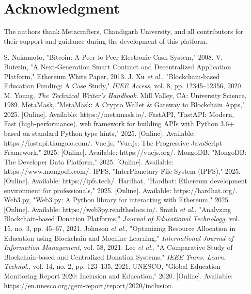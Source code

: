 \documentclass[a4paper,12pt]{report}
\begin{document}
\section*{Acknowledgment}
The authors thank Metacrafters, Chandigarh University, and all contributors for their support and guidance during the development of this platform.

\begin{thebibliography}{00}
 S. Nakamoto, "Bitcoin: A Peer-to-Peer Electronic Cash System," 2008.
 V. Buterin, "A Next-Generation Smart Contract and Decentralized Application Platform," Ethereum White Paper, 2013.
 J. Xu \textit{et al.}, "Blockchain-based Education Funding: A Case Study," \textit{IEEE Access}, vol. 8, pp. 12345--12356, 2020.
 M. Young, \textit{The Technical Writer's Handbook}. Mill Valley, CA: University Science, 1989.
 MetaMask, "MetaMask: A Crypto Wallet \& Gateway to Blockchain Apps," 2025. [Online]. Available: https://metamask.io/.
 FastAPI, "FastAPI: Modern, Fast (high-performance), web framework for building APIs with Python 3.6+ based on standard Python type hints," 2025. [Online]. Available: https://fastapi.tiangolo.com/.
 Vue.js, "Vue.js: The Progressive JavaScript Framework," 2025. [Online]. Available: https://vuejs.org/.
 MongoDB, "MongoDB: The Developer Data Platform," 2025. [Online]. Available: https://www.mongodb.com/.
 IPFS, "InterPlanetary File System (IPFS)," 2025. [Online]. Available: https://ipfs.tech/.
 Hardhat, "Hardhat: Ethereum development environment for professionals," 2025. [Online]. Available: https://hardhat.org/.
 Web3.py, "Web3.py: A Python library for interacting with Ethereum," 2025. [Online]. Available: https://web3py.readthedocs.io/.
 Smith \textit{et al.}, "Analyzing Blockchain-based Donation Platforms," \textit{Journal of Educational Technology}, vol. 15, no. 3, pp. 45--67, 2021.
 Johnson \textit{et al.}, "Optimizing Resource Allocation in Education using Blockchain and Machine Learning," \textit{International Journal of Information Management}, vol. 58, 2021.
 Lee \textit{et al.}, "A Comparative Study of Blockchain-based and Centralized Donation Systems," \textit{IEEE Trans. Learn. Technol.}, vol. 14, no. 2, pp. 123--135, 2021.
 UNESCO, "Global Education Monitoring Report 2020: Inclusion and Education," 2020. [Online]. Available: https://en.unesco.org/gem-report/report/2020/inclusion.
\end{thebibliography}
\end{document}

